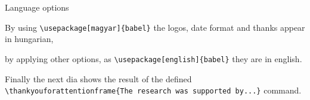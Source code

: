 \documentclass[aspectratio=169]{beamer}
\begin{document}
	\begin{frame}{Language options}
		
		By using \texttt{\textbackslash usepackage[magyar]\{babel\}} the logos, date format and thanks appear in hungarian, 
		
		\vspace{3mm}
		
		by applying other options, as \texttt{\textbackslash usepackage[english]\{babel\}} they are in english.
		
		\vspace{8mm}
		
		Finally the next dia shows the result of the defined \texttt{\textbackslash thankyouforattentionframe\{The research was supported by...\}} command.
		
	\end{frame}

	

	
\end{document}
